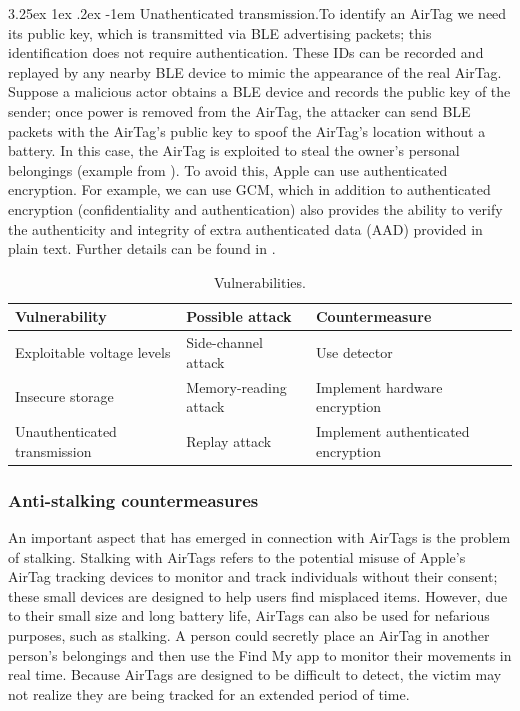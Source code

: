 \documentclass[english]{article}
\makeatletter
\renewcommand\paragraph{\@startsection{paragraph}{5}{\z@}%
  {3.25ex \@plus1ex \@minus.2ex}%
  {-1em}%
  {\normalfont\normalsize\bfseries}}
\makeatother
\begin{document}
\paragraph{Unathenticated transmission.}To identify an AirTag we need its public key, which is transmitted via BLE advertising packets; this identification does not require authentication. These IDs can be recorded and replayed by any nearby BLE device to mimic the appearance of the real AirTag. Suppose a malicious actor obtains a BLE device and records the public key of the sender; once power is removed from the AirTag, the attacker can send BLE packets with the AirTag's public key to spoof the AirTag's location without a battery. In this case, the AirTag is exploited to steal the owner's personal belongings (example from \cite{reverse}). To avoid this, Apple can use authenticated encryption. For example, we can use GCM, which in addition to authenticated encryption (confidentiality and authentication) also provides the ability to verify the authenticity and integrity of extra authenticated data (AAD) provided in plain text. Further details can be found in \cite{gcm}.

\begin{table}[h] 
  \caption{Vulnerabilities.}
  \centering
  \begin{tabularx}{\textwidth}{|X|X|X|}
    \hline
    \textbf{Vulnerability}      & \textbf{Possible attack} & \textbf{Countermeasure}             \\ \hline
    Exploitable voltage levels  & Side-channel attack      & Use detector         \\ \hline
    Insecure storage            & Memory-reading attack    & Implement hardware encryption \\ \hline
    Unauthenticated transmission & Replay attack            & Implement authenticated encryption                     \\ \hline
  \end{tabularx}
  \label{vuln}
\end{table}

\subsubsection{Anti-stalking countermeasures}\label{countermeasures}
An important aspect that has emerged in connection with AirTags is the problem of stalking. Stalking with AirTags refers to the potential misuse of Apple's AirTag tracking devices to monitor and track individuals without their consent; these small devices are designed to help users find misplaced items. However, due to their small size and long battery life, AirTags can also be used for nefarious purposes, such as stalking. A person could secretly place an AirTag in another person's belongings and then use the Find My app to monitor their movements in real time. Because AirTags are designed to be difficult to detect, the victim may not realize they are being tracked for an extended period of time.
\end{document}
